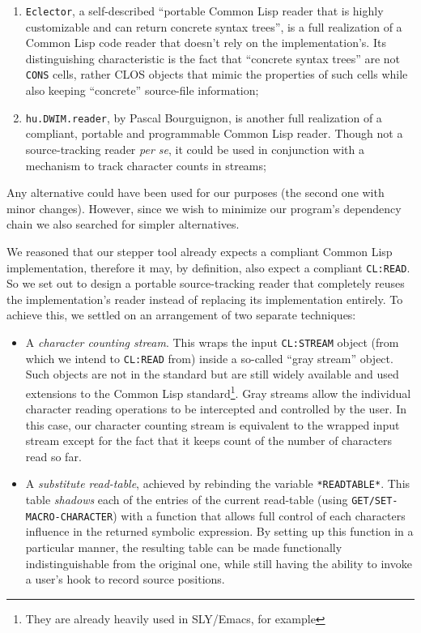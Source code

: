 \documentclass[sigconf]{acmart}
\begin{document}
\begin{enumerate}
\item \texttt{Eclector}\cite{eclector}, a self-described ``portable
  Common Lisp reader that is highly customizable and can return
  concrete syntax trees'', is a full realization of a Common Lisp code
  reader that doesn't rely on the implementation's.  Its
  distinguishing characteristic is the fact that ``concrete syntax
  trees'' are not \texttt{CONS} cells, rather CLOS objects that mimic
  the properties of such cells while also keeping ``concrete''
  source-file information;

\item \texttt{hu.DWIM.reader}\cite{bourguignon-reader}, by Pascal
  Bourguignon, is another full realization of a compliant, portable
  and programmable Common Lisp reader.  Though not a source-tracking
  reader \emph{per se}, it could be used in conjunction with a
  mechanism to track character counts in streams;
\end{enumerate}

Any alternative could have been used for our purposes (the second one
with minor changes).  However, since we wish to minimize our program's
dependency chain we also searched for simpler alternatives.

We reasoned that our stepper tool already expects a compliant Common
Lisp implementation, therefore it may, by definition, also expect a
compliant \texttt{CL:READ}.  So we set out to design a portable
source-tracking reader that completely reuses the implementation's
reader instead of replacing its implementation entirely.  To achieve
this, we settled on an arrangement of two separate techniques:

\begin{itemize}
\item A \emph{character counting stream}.  This wraps the input
  \texttt{CL:STREAM} object (from which we intend to \texttt{CL:READ}
  from) inside a so-called ``gray stream'' object.  Such objects are
  not in the standard but are still widely available and used
  extensions to the Common Lisp standard\footnote{They are already
    heavily used in SLY/Emacs, for example}.  Gray streams allow the
  individual character reading operations to be intercepted and
  controlled by the user.  In this case, our character counting stream
  is equivalent to the wrapped input stream except for the fact that
  it keeps count of the number of characters read so far.
  
\item A \emph{substitute read-table}, achieved by rebinding the
  variable \texttt{*READTABLE*}.  This table \emph{shadows} each of
  the entries of the current read-table (using
  \texttt{GET/SET-MACRO-CHARACTER}) with a function that allows full
  control of each characters influence in the returned symbolic
  expression.  By setting up this function in a particular manner, the
  resulting table can be made functionally indistinguishable from the
  original one, while still having the ability to invoke a user's
  hook to record source positions.
\end{itemize}
\end{document}
